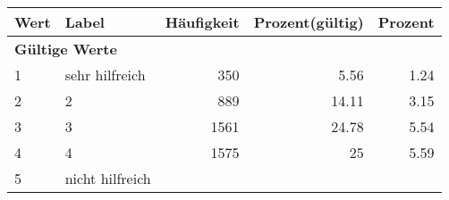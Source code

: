     \begin{longtable}{lXrrr}
     \toprule
     \textbf{Wert} & \textbf{Label} & \textbf{Häufigkeit} & \textbf{Prozent(gültig)} & \textbf{Prozent} \\
     \endhead
     \midrule
     \multicolumn{5}{l}{\textbf{Gültige Werte}}\\

     1 &
     \multicolumn{1}{X}{ sehr hilfreich   } &


       \num{350} &
       \num[round-mode=places,round-precision=2]{5,56} &
         \num[round-mode=places,round-precision=2]{1,24} \\

     2 &
     \multicolumn{1}{X}{ 2   } &


       \num{889} &
       \num[round-mode=places,round-precision=2]{14,11} &
         \num[round-mode=places,round-precision=2]{3,15} \\

     3 &
     \multicolumn{1}{X}{ 3   } &


       \num{1561} &
       \num[round-mode=places,round-precision=2]{24,78} &
         \num[round-mode=places,round-precision=2]{5,54} \\

     4 &
     \multicolumn{1}{X}{ 4   } &


       \num{1575} &
       \num[round-mode=places,round-precision=2]{25} &
         \num[round-mode=places,round-precision=2]{5,59} \\

     5 &
     \multicolumn{1}{X}{ nicht hilfreich   } &



\end{longtable}
